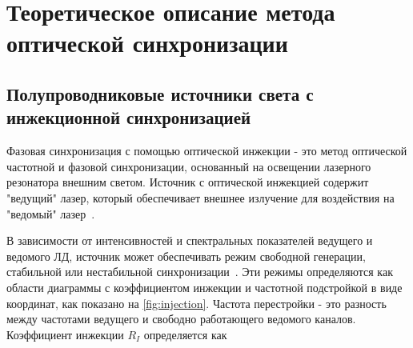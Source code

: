 \section{Теоретическое описание метода оптической синхронизации}
\label{sec:theory}

\subsection{Полупроводниковые источники света с инжекционной синхронизацией}

Фазовая синхронизация с помощью оптической инжекции - это метод оптической частотной и фазовой синхронизации, основанный на освещении лазерного резонатора внешним светом. Источник с оптической инжекцией содержит "ведущий" лазер, который обеспечивает внешнее излучение для воздействия на "ведомый" лазер~\cite{liu2020}. 

В зависимости от интенсивностей и спектральных показателей ведущего и ведомого ЛД, источник может обеспечивать режим свободной генерации, стабильной или нестабильной синхронизации~\cite{lau2008}. Эти режимы определяются как области диаграммы с коэффициентом инжекции и частотной подстройкой в виде координат, как показано на \cref{fig:injection}. Частота перестройки - это разность между частотами ведущего и свободно работающего ведомого каналов. Коэффициент инжекции $R_I$ определяется как 

